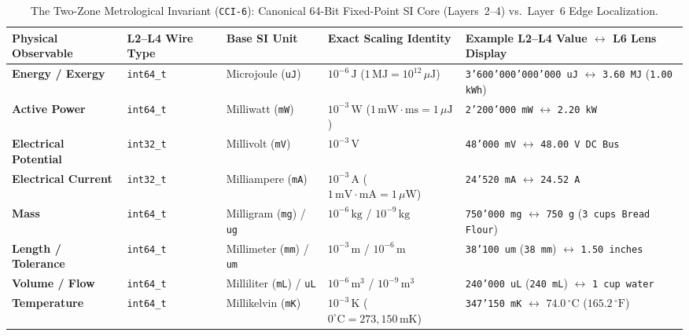 \begin{table}[htbp]
\centering
\caption{The Two-Zone Metrological Invariant (\texttt{CCI-6}): Canonical 64-Bit Fixed-Point SI Core (Layers~2--4) vs.\ Layer~6 Edge Localization.}
\label{tab:l2-canonical-si-core}
\footnotesize
\begin{tabular}{@{}llllp{4.3cm}@{}}
\toprule
\textbf{Physical Observable} & \textbf{L2--L4 Wire Type} & \textbf{Base SI Unit} & \textbf{Exact Scaling Identity} & \textbf{Example L2--L4 Value $\leftrightarrow$ L6 Lens Display} \\
\midrule
\textbf{Energy / Exergy} & \texttt{int64\_t} & Microjoule (\texttt{uJ}) & $10^{-6}\,\mathrm{J}$ ($1\,\mathrm{MJ} = 10^{12}\,\mu\mathrm{J}$) & \texttt{3'600'000'000'000 uJ} $\leftrightarrow$ \texttt{3.60 MJ} (\texttt{1.00 kWh}) \\
\textbf{Active Power} & \texttt{int64\_t} & Milliwatt (\texttt{mW}) & $10^{-3}\,\mathrm{W}$ ($1\,\mathrm{mW}\cdot\mathrm{ms} = 1\,\mu\mathrm{J}$) & \texttt{2'200'000 mW} $\leftrightarrow$ \texttt{2.20 kW} \\
\textbf{Electrical Potential} & \texttt{int32\_t} & Millivolt (\texttt{mV}) & $10^{-3}\,\mathrm{V}$ & \texttt{48'000 mV} $\leftrightarrow$ \texttt{48.00 V DC Bus} \\
\textbf{Electrical Current} & \texttt{int32\_t} & Milliampere (\texttt{mA}) & $10^{-3}\,\mathrm{A}$ ($1\,\mathrm{mV}\cdot\mathrm{mA} = 1\,\mu\mathrm{W}$) & \texttt{24'520 mA} $\leftrightarrow$ \texttt{24.52 A} \\
\textbf{Mass} & \texttt{int64\_t} & Milligram (\texttt{mg}) / \texttt{ug} & $10^{-6}\,\mathrm{kg}$ / $10^{-9}\,\mathrm{kg}$ & \texttt{750'000 mg} $\leftrightarrow$ \texttt{750 g} (\texttt{3 cups Bread Flour}) \\
\textbf{Length / Tolerance} & \texttt{int64\_t} & Millimeter (\texttt{mm}) / \texttt{um} & $10^{-3}\,\mathrm{m}$ / $10^{-6}\,\mathrm{m}$ & \texttt{38'100 um} (\texttt{38 mm}) $\leftrightarrow$ \texttt{1.50 inches} \\
\textbf{Volume / Flow} & \texttt{int64\_t} & Milliliter (\texttt{mL}) / \texttt{uL} & $10^{-6}\,\mathrm{m^3}$ / $10^{-9}\,\mathrm{m^3}$ & \texttt{240'000 uL} (\texttt{240 mL}) $\leftrightarrow$ \texttt{1 cup water} \\
\textbf{Temperature} & \texttt{int64\_t} & Millikelvin (\texttt{mK}) & $10^{-3}\,\mathrm{K}$ ($0^\circ\mathrm{C} = 273{,}150\,\mathrm{mK}$) & \texttt{347'150 mK} $\leftrightarrow$ $74.0\,^\circ\mathrm{C}$ ($165.2\,^\circ\mathrm{F}$) \\

\end{tabular}
\end{table}
